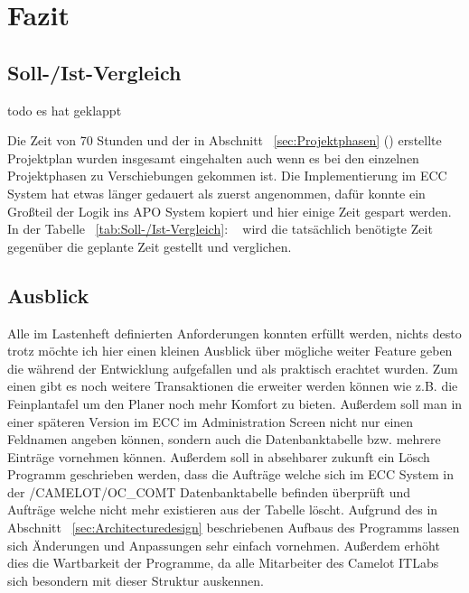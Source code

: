 \section{Fazit} 
\label{sec:Fazit}

\subsection{Soll-/Ist-Vergleich}
\label{sec:SollIstVergleich}

todo es hat geklappt

Die Zeit von 70 Stunden und der in Abschnitt ~\ref{sec:Projektphasen} () erstellte Projektplan wurden insgesamt eingehalten auch wenn es bei den einzelnen Projektphasen zu Verschiebungen gekommen ist. Die Implementierung im \ac{ECC} System hat etwas länger gedauert als zuerst angenommen, dafür konnte ein Großteil der Logik ins \ac{APO} System kopiert und hier einige Zeit gespart werden. In der Tabelle ~\ref{tab:Soll-/Ist-Vergleich}: ~ wird die tatsächlich benötigte Zeit gegenüber die geplante Zeit gestellt und verglichen.

\subsection{Ausblick}
\label{sec:Ausblick}
Alle im Lastenheft definierten Anforderungen konnten erfüllt werden, nichts desto trotz möchte ich hier einen kleinen Ausblick über mögliche weiter Feature geben die während der Entwicklung aufgefallen und als praktisch erachtet wurden. Zum einen gibt es noch weitere Transaktionen die erweiter werden können wie z.B. die Feinplantafel um den Planer noch mehr Komfort zu bieten. Außerdem soll man in einer späteren Version im \ac{ECC} im Administration Screen nicht nur einen Feldnamen angeben können, sondern auch die Datenbanktabelle bzw. mehrere Einträge vornehmen können. Außerdem soll in absehbarer zukunft ein Lösch Programm geschrieben werden, dass die Aufträge welche sich im ECC System in der /CAMELOT/OC\_COMT Datenbanktabelle befinden überprüft und Aufträge welche nicht mehr existieren aus der Tabelle löscht. Aufgrund des in Abschnitt ~\ref{sec:Architecturedesign} beschriebenen Aufbaus des Programms lassen sich Änderungen und Anpassungen sehr einfach vornehmen. Außerdem erhöht dies die Wartbarkeit der Programme, da alle Mitarbeiter des Camelot ITLabs sich besondern mit dieser Struktur auskennen. 
